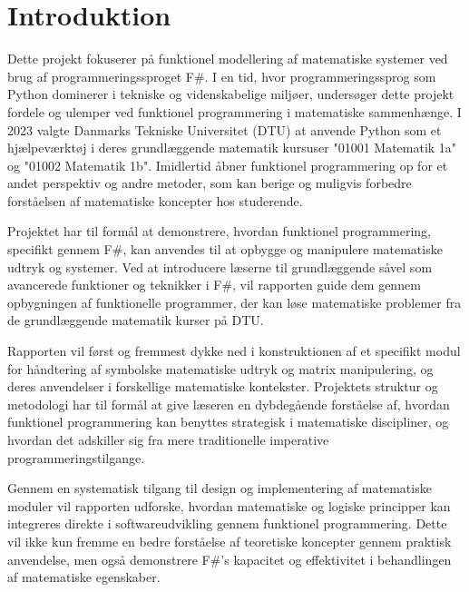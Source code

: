\section{Introduktion} 

Dette projekt fokuserer på funktionel modellering af matematiske systemer ved brug af programmeringssproget F\#. I en tid, hvor programmeringssprog som Python dominerer i tekniske og videnskabelige miljøer, undersøger dette projekt fordele og ulemper ved funktionel programmering i matematiske sammenhænge. I 2023 valgte Danmarks Tekniske Universitet (DTU) at anvende Python som et hjælpeværktøj i deres grundlæggende matematik kursuser "01001 Matematik 1a" og "01002 Matematik 1b". Imidlertid åbner funktionel programmering op for et andet perspektiv og andre metoder, som kan berige og muligvis forbedre forståelsen af matematiske koncepter hos studerende.

Projektet har til formål at demonstrere, hvordan funktionel programmering, specifikt gennem F\#, kan anvendes til at opbygge og manipulere matematiske udtryk og systemer. Ved at introducere læserne til grundlæggende såvel som avancerede funktioner og teknikker i F\#, vil rapporten guide dem gennem opbygningen af funktionelle programmer, der kan løse matematiske problemer fra de grundlæggende matematik kurser på DTU. 

Rapporten vil først og fremmest dykke ned i konstruktionen af et specifikt modul for håndtering af symbolske matematiske udtryk og matrix manipulering, og deres anvendelser i forskellige matematiske kontekster. Projektets struktur og metodologi har til formål at give læseren en dybdegående forståelse af, hvordan funktionel programmering kan benyttes strategisk i matematiske discipliner, og hvordan det adskiller sig fra mere traditionelle imperative programmeringstilgange.

Gennem en systematisk tilgang til design og implementering af matematiske moduler vil rapporten udforske, hvordan matematiske og logiske principper kan integreres direkte i softwareudvikling gennem funktionel programmering. Dette vil ikke kun fremme en bedre forståelse af teoretiske koncepter gennem praktisk anvendelse, men også demonstrere F\#'s kapacitet og effektivitet i behandlingen af matematiske egenskaber.
 